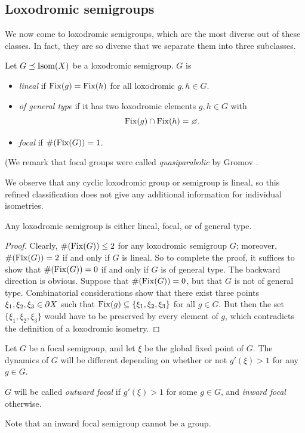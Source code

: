\subsection{Loxodromic semigroups}
\label{subsubsectionloxodromic}
We now come to loxodromic semigroups, which are the most diverse out of these classes. In fact, they are so diverse that we separate them into three subclasses.
\begin{definition}
\label{definitionCCMT}
Let $G\preceq\operatorname{Isom}(X)$ be a loxodromic semigroup. $G$ is
\begin{itemize}
\item \emph{lineal} if $\operatorname{Fix}(g) = \operatorname{Fix}(h)$ for all loxodromic $g,h\in G$.
\item \emph{of general type} if it has two loxodromic elements $g,h\in G$ with 
\[
\Fix(g)\cap\Fix(h) = \emptyset.
\]
\item \emph{focal} if $\#(\operatorname{Fix}(G)) = 1$.
\end{itemize}
(We remark that focal groups were called \emph{quasiparabolic} by Gromov \cite[, Case 4']{Gromov3}.
\end{definition}
We observe that any cyclic loxodromic group or semigroup is lineal, so this refined classification does not give any additional information for individual isometries.

\begin{proposition}
Any loxodromic semigroup is either lineal, focal, or of general type.
\end{proposition}
\begin{proof}
Clearly, $\#(\operatorname{Fix}(G))\leq 2$ for any loxodromic semigroup $G$; moreover, $\#(\operatorname{Fix}(G)) = 2$ if and only if $G$ is lineal. So to complete the proof, it suffices to show that $\#(\operatorname{Fix}(G)) = 0$ if and only if $G$ is of general type. The backward direction is obvious. Suppose that $\#(\operatorname{Fix}(G)) = 0$, but that $G$ is not of general type. Combinatorial considerations show that there exist three points $\xi_1,\xi_2,\xi_3\in\partial X$ such that $\operatorname{Fix}(g)\subseteq\{\xi_1,\xi_2,\xi_3\}$ for all $g\in G$. But then the set $\{\xi_1,\xi_2,\xi_3\}$ would have to be preserved by every element of $g$, which contradicts the definition of a loxodromic isometry.
\end{proof}

Let $G$ be a focal semigroup, and let $\xi$ be the global fixed point of $G$. The dynamics of $G$ will be different depending on whether or not $g'(\xi) > 1$ for any $g\in G$.
\begin{definition}
\label{definitionfocal}
$G$ will be called \emph{outward focal} if $g'(\xi) > 1$ for some $g\in G$, and \emph{inward focal} otherwise.
\end{definition}
Note that an inward focal semigroup cannot be a group.


